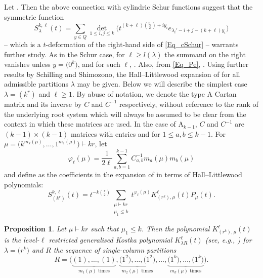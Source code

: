 \documentclass[pdftex]{sigma}
\numberwithin{equation}{section}
\newtheorem{Proposition}[Theorem]{Proposition}
\renewcommand{\leq}{\leqslant}
\renewcommand{\geq}{\geqslant}
\DeclareMathOperator{\Par}{Par}
\newcommand{\la}{\lambda}
\begin{document}
Let \smash{$\la\in\Par_{n,k}^{\ell}$}.
Then the above connection with cylindric Schur functions suggest that
the symmetric function
\begin{equation*}%
S_{\la}^{k,\ell}(t)=\sum_{y\in Q} \det_{1\leq i,j\leq k}
\bigl(t^{(k+\ell)\binom{y_i}{2}+iy_i} e_{\la_i'-i+j-(k+\ell)y_i} \bigr)
\end{equation*}
-- which is a $t$-deformation of the right-hand side of \eqref{Eq_cSchur}
-- warrants further study.
As in the Schur case, for $\ell\geq l(\la)$ the summand on the right
vanishes unless $y=\bigl(0^k\bigr)$, and for such $\ell$,
\smash{$S_{\la}^{k,\ell}(t)=s_{\la}$}.
Also, from \eqref{Eq_Pe}, .
Using further results by Schilling and Shimozono, the Hall--Littlewood
expansion of \smash{$S_{\la}^{k,\ell}(t)$} for all admissible partitions $\la$
may be given.
Below we will describe the simplest case $\la=(k^r)$ and $\ell\geq 1$.
By abuse of notation, we denote the type $\mathrm{A}$ Cartan matrix
and its inverse by $C$ and $C^{-1}$ respectively, without reference to
the rank of the underlying root system which will always be assumed to
be clear from the context in which these matrices are used.
In the case of $\mathrm{A}_{k-1}$, $C$ and $C^{-1}$ are
$(k-1)\times (k-1)$ matrices with entries
and  for $1\leq a,b\leq k-1$.
For $\mu=\bigl(k^{m_k(\mu)},\dots,1^{m_1(\mu)}\bigr)\vdash kr$, let
\[
\varphi_{\ell}(\mu)=\frac{1}{2\ell}
\sum_{a,b=1}^{k-1} C^{-1}_{a,b} m_a(\mu) m_b(\mu)
\]
and define  as the coefficients in the
expansion of  in terms of Hall--Littlewood polynomials:
\[
S_{(k^r)}^{k,\ell}(t)=t^{-k\binom{r}{2}}
\sum_{\substack{\mu\vdash kr\\[1pt] \mu_1\leq k}} t^{\varphi_{\ell}(\mu)}
K_{(r^k),\mu}^{\ell}(t) P_{\mu}(t).
\]

\begin{Proposition}\label{Prop_Kostka}
Let $\mu\vdash kr$ such that $\mu_1\leq k$.
Then the polynomial
$K_{(r^k),\mu}^{\ell}(t)$
is the level-$\ell$ restricted generalised Kostka polynomial
$K_{\la R}^{\ell}(t)$
\textup{(}see, e.g., \textup{\cite{SS00,SS01}}\textup{)}
for $\la=\bigl(r^k\bigr)$ and $R$ the sequence of single-column partitions
\[
R=\bigl(
\underbrace{(1),\dots,(1)}_{m_1(\mu) \text{ times}},
\underbrace{\bigl(1^2\bigr),\dots,\bigl(1^2\bigr)}_{m_2(\mu) \text{ times}},\dots,
\underbrace{\bigl(1^k\bigr),\dots,\bigl(1^k\bigr)}_{m_k(\mu) \text{ times}}
\bigr).
\]
\end{Proposition}
\end{document}
